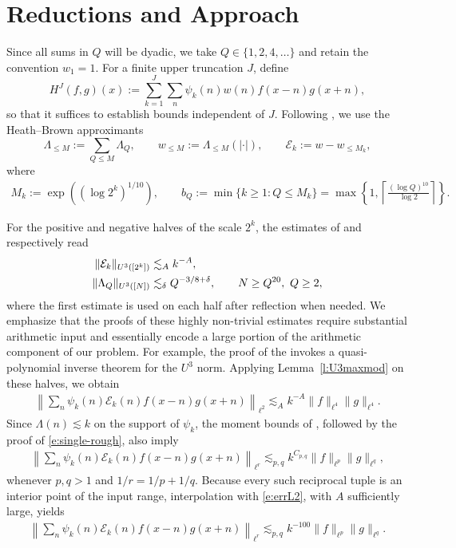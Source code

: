 \documentclass[12pt,leqno]{amsart}
\numberwithin{equation}{section}
\theoremstyle{definition}
\theoremstyle{plain}
\begin{document}
	\section{Reductions and Approach}\label{s:red}
	Since all sums in $Q$ will be dyadic, we take $Q\in\{1,2,4,\ldots\}$
	and retain the convention $w_1=1$.
	For a finite upper truncation $J$, define
	\[
	H^J(f,g)(x):=\sum_{k=1}^J\sum_n
	\psi_k(n)w(n)f(x-n)g(x+n),
	\]
	so that it suffices to establish bounds independent of $J$.
	Following \cite{F+,FKMS26}, we use the Heath--Brown approximants
	\[
	\Lambda_{\leq M}:=\sum_{Q\leq M}\Lambda_Q,\qquad
	w_{\leq M}:=\Lambda_{\leq M}(|\cdot|),\qquad
	\mathcal E_k:=w-w_{\leq M_k},
	\]
	where
	\begin{align}\label{e:bQ}
		M_k:=\exp((\log 2^k)^{1/10}),\qquad
		b_Q:=\min\{k\geq1:Q\leq M_k\}
		=\max\left\{1,\left\lceil\frac{(\log Q)^{10}}{\log2}\right\rceil\right\}.
	\end{align}
	
	
	For the positive and negative halves of the scale $2^k$, the estimates
	of \cite[Propositions 3.1]{F+} and \cite[Proposition 2.1]{F+} respectively read
	\begin{align}\label{e:arithmeticU3}
		\|\mathcal E_k\|_{U^3([2^k])}&\lesssim_A k^{-A},\notag\\
		\|\Lambda_Q\|_{U^3([N])}&\lesssim_\delta Q^{-3/8+\delta},
		\qquad N \geq Q^{20},\ Q\geq2,
	\end{align}
	where the first estimate is used on each half after reflection when needed. We emphasize that the proofs of these highly non-trivial estimates require substantial arithmetic input and essentially encode a large portion of the arithmetic component of our problem. For example, the proof of the \cite[Proposition 3.1]{F+} invokes a quasi-polynomial inverse theorem for the $U^3$ norm.
	Applying Lemma~\ref{l:U3maxmod} on these halves, we obtain
	\begin{align}\label{e:errL2}
		\left\|\sum_n\psi_k(n)\mathcal E_k(n)f(x-n)g(x+n)\right\|_{\ell^2}
		\lesssim_A k^{-A}\|f\|_{\ell^4}\|g\|_{\ell^4}.
	\end{align}
	Since $\Lambda(n)\lesssim k$ on the support of $\psi_k$, the moment
	bounds of \cite[Lemma 4.6]{KMTT25}, followed by the proof of
	\eqref{e:single-rough}, also imply
	\begin{align}\label{e:errrough}
		\left\|\sum_n\psi_k(n)\mathcal E_k(n)f(x-n)g(x+n)\right\|_{\ell^r}
		\lesssim_{p,q} k^{C_{p,q}}\|f\|_{\ell^p}\|g\|_{\ell^q},
	\end{align}
	whenever $p,q>1$ and $1/r=1/p+1/q$.
	Because every such reciprocal tuple is an interior point of the input
	range, interpolation with \eqref{e:errL2}, with $A$ sufficiently large,
	yields
	\begin{align}\label{e:error-summable}
		\left\|\sum_n\psi_k(n)\mathcal E_k(n)f(x-n)g(x+n)\right\|_{\ell^r}
		\lesssim_{p,q} k^{-100}\|f\|_{\ell^p}\|g\|_{\ell^q}.
	\end{align}
	
\end{document}
